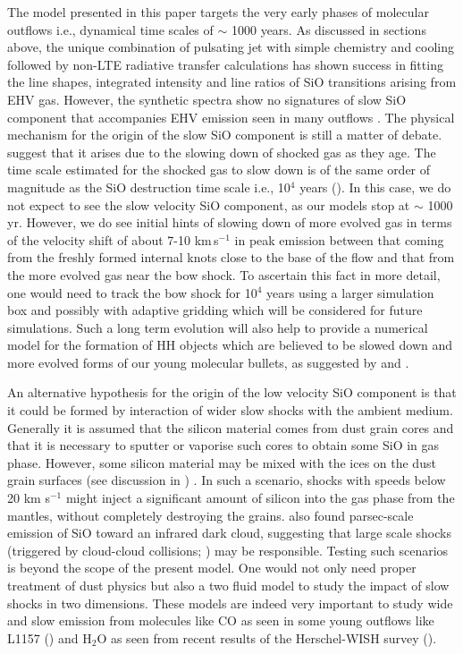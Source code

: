 \documentclass[useAMS,usenatbib]{mn2e}
\begin{document}
The model presented in this paper targets the very early phases of molecular
outflows i.e., dynamical time scales of $\sim$ 1000 years.
As discussed in sections above, the unique combination of pulsating
jet with simple chemistry and cooling followed by non-LTE radiative transfer
calculations has shown success in fitting the line shapes, integrated intensity and line ratios of SiO
transitions arising from EHV gas. However, the synthetic spectra show
no signatures of slow SiO component that accompanies EHV emission seen
in many outflows \citep[e.g.,][]{Lefloch:1998p13983,
  Codella:1999p12584}. 
The physical mechanism for the origin of the slow SiO component is still a matter
of debate. \cite{Codella:1999p12584} suggest that it arises due to the slowing down of
shocked gas as they age. The time scale estimated for the shocked gas
to slow down is of the same order of magnitude as the SiO destruction
time scale i.e., 10$^{4}$ years (\citealt{Codella:1999p12584}). In this
case, we do not expect to see the slow velocity SiO component, as our
models stop at $\sim$ 1000 yr. However, we do see initial 
hints of slowing down of more evolved gas in terms of the velocity
shift of about 7-10 km\,s$^{-1}$ in peak emission between that
coming from the freshly formed internal knots close to the base of the
flow and that from the more evolved gas near the
bow shock. To ascertain this fact in more detail, one would
need to track the bow shock for 10$^{4}$ years
using a larger simulation box and possibly with adaptive gridding 
which will be considered for future simulations. Such a long term
evolution will also help to provide a numerical model for the formation of HH objects
which are believed to be slowed down and more evolved forms of our
young molecular bullets, as suggested by \cite{Norman:1979p14858} and
  \cite{Hartigan:1987p11178}.
%

An alternative hypothesis for the origin of the low velocity SiO
component is that it could be formed by interaction of wider slow
shocks with the ambient medium. Generally it is assumed that the silicon material comes from dust
grain cores and that it is necessary to sputter or vaporise such cores
to obtain some SiO in gas phase. However, some silicon material may be
mixed with the ices on the dust grain surfaces (see discussion in \citealt{Schilke:1997p14140}) . In such a scenario, 
shocks with speeds below 20 km s$^{-1}$ might inject a significant
amount of silicon into the gas phase from the mantles, without 
completely destroying the grains. \cite{JimenezSerra:2010p15530} also found parsec-scale emission of SiO
toward an infrared dark cloud, suggesting that large scale shocks
(triggered by cloud-cloud collisions; \citealt{Henshaw:2013p15540}) may
be responsible.
Testing such scenarios is beyond
the scope of the present model. One would not only need proper
treatment of dust physics but also a two fluid model to study the impact
of slow shocks in two dimensions. These models are indeed very
important to study wide and slow emission from molecules like CO 
as seen in some young outflows like L1157 (\citealt{GomezRuiz:2013p14549})
and H$_{2}$O as seen from recent results of the Herschel-WISH survey
(\citealt{Tafalla:2013p12586}).
\end{document}
